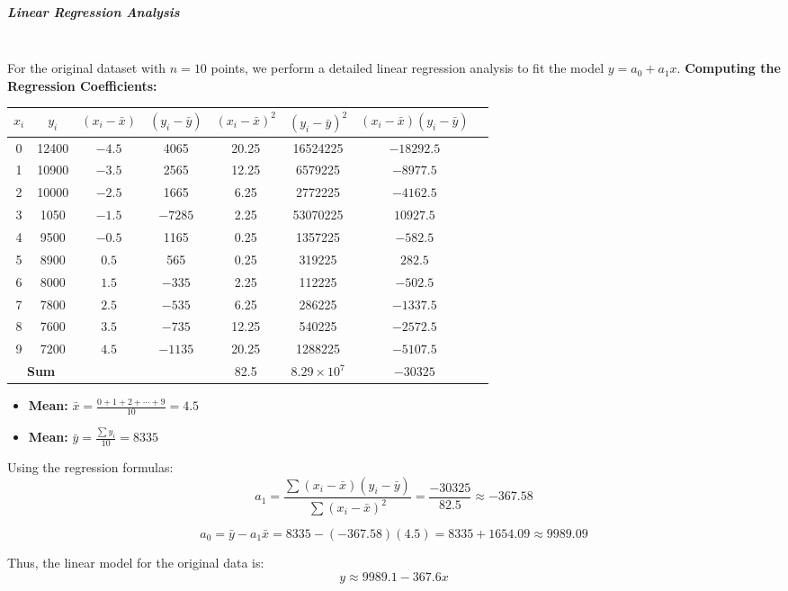 \subparagraph{Linear Regression Analysis} \mbox{} \\
For the original dataset with $n=10$ points, we perform a detailed linear regression analysis to fit the model $y = a_0 + a_1x$.
\textbf{Computing the Regression Coefficients:}

\begin{table}[H]
\centering
\begin{tabular}{|c|c|c|c|c|c|c|c|}
\hline
$x_i$ & $y_i$ & $(x_i - \bar{x})$ & $(y_i - \bar{y})$ & $(x_i - \bar{x})^2$ & $(y_i - \bar{y})^2$ & $(x_i - \bar{x})(y_i - \bar{y})$ \\
\hline
0 & 12400 & $-4.5$ & 4065 & 20.25 & 16524225 & $-18292.5$ \\
1 & 10900 & $-3.5$ & 2565 & 12.25 & 6579225 & $-8977.5$ \\
2 & 10000 & $-2.5$ & 1665 & 6.25 & 2772225 & $-4162.5$ \\
3 & 1050 & $-1.5$ & $-7285$ & 2.25 & 53070225 & $10927.5$ \\
4 & 9500 & $-0.5$ & 1165 & 0.25 & 1357225 & $-582.5$ \\
5 & 8900 & $0.5$ & 565 & 0.25 & 319225 & $282.5$ \\
6 & 8000 & $1.5$ & $-335$ & 2.25 & 112225 & $-502.5$ \\
7 & 7800 & $2.5$ & $-535$ & 6.25 & 286225 & $-1337.5$ \\
8 & 7600 & $3.5$ & $-735$ & 12.25 & 540225 & $-2572.5$ \\
9 & 7200 & $4.5$ & $-1135$ & 20.25 & 1288225 & $-5107.5$ \\
\hline
\multicolumn{2}{|c|}{\textbf{Sum}} & & & 82.5 & $8.29 \times 10^7$ & $-30325$ \\
\hline
\end{tabular}
\end{table}
\begin{itemize}
    \item \textbf{Mean:} $\bar{x} = \frac{0+1+2+\cdots+9}{10} = 4.5$
    \item \textbf{Mean:} $\bar{y} = \frac{\sum y_i}{10} = 8335$
\end{itemize}
Using the regression formulas:
\[
a_1 = \frac{\sum (x_i - \bar{x})(y_i - \bar{y})}{\sum (x_i - \bar{x})^2} = \frac{-30325}{82.5} \approx -367.58
\]

\[
a_0 = \bar{y} - a_1\bar{x} = 8335 - (-367.58)(4.5) = 8335 + 1654.09 \approx 9989.09
\]

Thus, the linear model for the original data is:
\[
y \approx 9989.1 - 367.6x
\]

